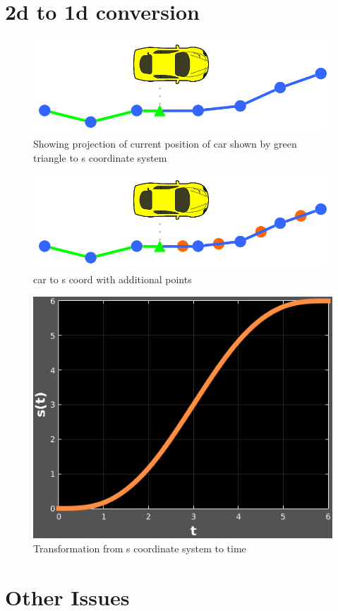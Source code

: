 \documentclass[letterpaper, 10 pt, conference]{ieeeconf}  %
\begin{document}
\section{2d to 1d conversion}


\begin{figure}[thpb]
  \centering
  \includegraphics[width=0.5\columnwidth]{graphics/PathProjection.png}
  \caption{Showing projection of current position of car shown by green triangle to s coordinate system}
  \label{fig:cartos}
\end{figure}
\begin{figure}[thpb]
  \centering
  \includegraphics[width=0.5\columnwidth]{graphics/PathProjectionSlice.png}
  \caption{car to s coord with additional points}
  \label{fig:cartos2}
\end{figure}
\begin{figure}[thpb]
  \centering
  \includegraphics[width=0.5\columnwidth]{graphics/s(t)_generic.png}
  \caption{Transformation from s coordinate system to time}
  \label{fig:stot}
\end{figure}

\section{Other Issues}
                
\end{document}
